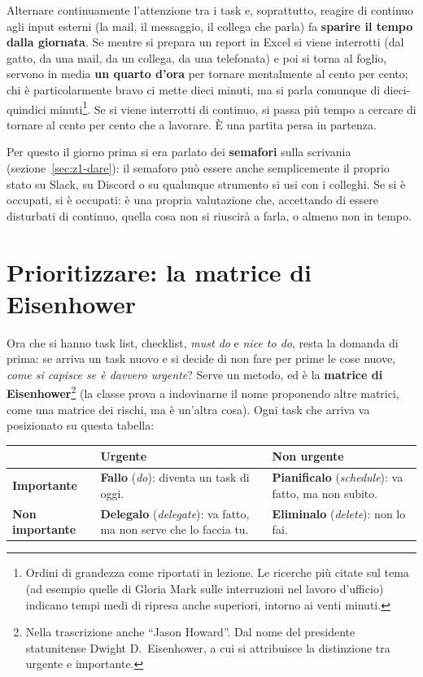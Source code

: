 Alternare continuamente l'attenzione tra i task e, soprattutto, reagire di
continuo agli input esterni (la mail, il messaggio, il collega che parla) fa
\textbf{sparire il tempo dalla giornata}. Se mentre si prepara un report in
Excel si viene interrotti (dal gatto, da una mail, da un collega, da una
telefonata) e poi si torna al foglio, servono in media \textbf{un quarto d'ora}
per tornare mentalmente al cento per cento; chi è particolarmente bravo ci mette
dieci minuti, ma si parla comunque di dieci-quindici minuti\footnote{Ordini di
grandezza come riportati in lezione. Le ricerche più citate sul tema (ad esempio
quelle di Gloria Mark sulle interruzioni nel lavoro d'ufficio) indicano tempi
medi di ripresa anche superiori, intorno ai venti minuti.}. Se si viene
interrotti di continuo, si passa più tempo a cercare di tornare al cento per
cento che a lavorare. È una partita persa in partenza.

Per questo il giorno prima si era parlato dei \textbf{semafori} sulla scrivania
(sezione~\ref{sec:z1-dare}): il semaforo può essere anche semplicemente il
proprio stato su Slack, su Discord o su qualunque strumento si usi con i
colleghi. Se si è occupati, si è occupati: è una propria valutazione che,
accettando di essere disturbati di continuo, quella cosa non si riuscirà a
farla, o almeno non in tempo.

\section{Prioritizzare: la matrice di Eisenhower}
\label{sec:z2-eisenhower}

Ora che si hanno task list, checklist, \emph{must do} e \emph{nice to do}, resta
la domanda di prima: se arriva un task nuovo e si decide di non fare per prime le
cose nuove, \emph{come si capisce se è davvero urgente}? Serve un metodo, ed è la
\textbf{matrice di Eisenhower}\footnote{Nella trascrizione anche ``Jason
Howard''. Dal nome del presidente statunitense Dwight D.~Eisenhower, a cui si
attribuisce la distinzione tra urgente e importante.} (la classe prova a
indovinarne il nome proponendo altre matrici, come una matrice dei rischi, ma è
un'altra cosa). Ogni task che arriva va posizionato su questa tabella:

\begin{center}
  \begin{tabular}{@{}p{}p{}p{}@{}}
    \toprule
    & \textbf{Urgente} & \textbf{Non urgente} \\
    \midrule
    \textbf{Importante} &
    \textbf{Fallo} (\emph{do}): diventa un task di oggi. &
    \textbf{Pianificalo} (\emph{schedule}): va fatto, ma non subito. \\
    \addlinespace
    \textbf{Non importante} &
    \textbf{Delegalo} (\emph{delegate}): va fatto, ma non serve che lo faccia
    tu. &
    \textbf{Eliminalo} (\emph{delete}): non lo fai. \\
    \bottomrule
  \end{tabular}
\end{center}

